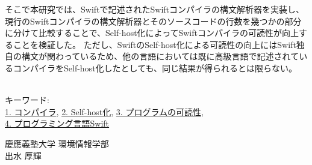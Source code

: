 そこで本研究では、Swiftで記述されたSwiftコンパイラの構文解析器を実装し、現行のSwiftコンパイラの構文解析器とそのソースコードの行数を幾つかの部分に分けて比較することで、Self-host化によってSwiftコンパイラの可読性が向上することを検証した。
ただし、SwiftのSelf-host化による可読性の向上にはSwift独自の構文が関わっているため、他の言語においては既に高級言語で記述されているコンパイラをSelf-host化したとしても、同じ結果が得られるとは限らない。

~ \\
キーワード:\\
\underline{1. コンパイラ},
\underline{2. Self-host化},
\underline{3. プログラムの可読性},\\
\underline{4. プログラミング言語Swift}
\begin{flushright}
慶應義塾大学 環境情報学部\\
出水 厚輝
\end{flushright}
